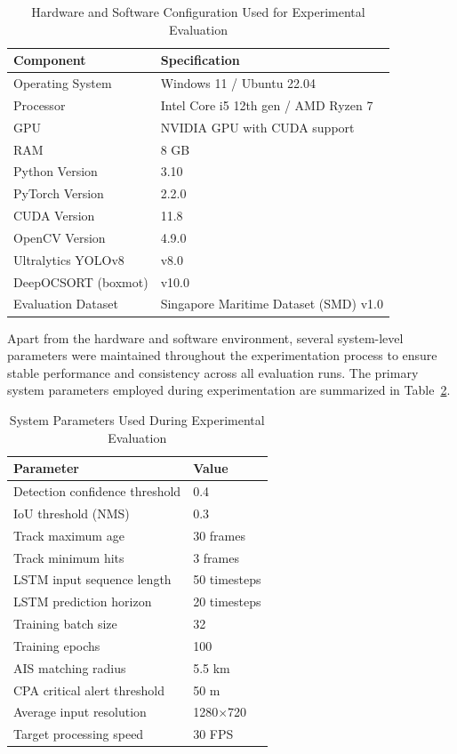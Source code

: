 \begin{table}[H]
\centering
\caption{Hardware and Software Configuration Used for Experimental Evaluation}
\label{c5:tab:hardware}
\begin{tabular}{|l|l|}
\hline
\textbf{Component} & \textbf{Specification}\\
\hline
Operating System & Windows 11 / Ubuntu 22.04\\
Processor & Intel Core i5 12th gen / AMD Ryzen 7\\
GPU & NVIDIA GPU with CUDA support\\
RAM & 8 GB\\
Python Version & 3.10\\
PyTorch Version & 2.2.0\\
CUDA Version & 11.8\\
OpenCV Version & 4.9.0\\
Ultralytics YOLOv8 & v8.0\\
DeepOCSORT (boxmot) & v10.0\\
Evaluation Dataset & Singapore Maritime Dataset (SMD) v1.0\\
\hline
\end{tabular}
\end{table}

Apart from the hardware and software environment, several system-level parameters were maintained throughout the experimentation process to ensure stable performance and consistency across all evaluation runs. The primary system parameters employed during experimentation are summarized in Table~\ref{c5:tab:parameters}.

\begin{table}[H]
\centering
\caption{System Parameters Used During Experimental Evaluation}
\label{c5:tab:parameters}
\begin{tabular}{|l|l|}
\hline
\textbf{Parameter} & \textbf{Value}\\
\hline
Detection confidence threshold & 0.4\\
IoU threshold (NMS) & 0.3\\
Track maximum age & 30 frames\\
Track minimum hits & 3 frames\\
LSTM input sequence length & 50 timesteps\\
LSTM prediction horizon & 20 timesteps\\
Training batch size & 32\\
Training epochs & 100\\
AIS matching radius & 5.5 km\\
CPA critical alert threshold & 50 m\\
Average input resolution & 1280$\times$720\\
Target processing speed & 30 FPS\\
\hline
\end{tabular}
\end{table}

